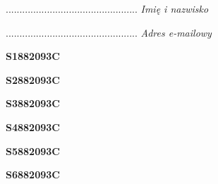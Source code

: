 \begin{turn}{90}\begin{minipage}{\linewidth} \vspace{20mm} ................................................  \textit{Imię i nazwisko}\end{minipage}\end{turn}

\begin{turn}{90}\begin{minipage}{\linewidth} \vspace{20mm} ................................................  \textit{Adres e-mailowy}\end{minipage}\end{turn}

\begin{turn}{90}\huge \begin{minipage}{\linewidth} \vspace{10mm}\textbf{S1882093C}\end{minipage}\end{turn}

\begin{turn}{90}\huge \begin{minipage}{\linewidth} \vspace{10mm}\textbf{S2882093C}\end{minipage}\end{turn}

\begin{turn}{90}\huge \begin{minipage}{\linewidth} \vspace{10mm}\textbf{S3882093C}\end{minipage}\end{turn}

\begin{turn}{90}\huge \begin{minipage}{\linewidth} \vspace{10mm}\textbf{S4882093C}\end{minipage}\end{turn}

\begin{turn}{90}\huge \begin{minipage}{\linewidth} \vspace{10mm}\textbf{S5882093C}\end{minipage}\end{turn}

\begin{turn}{90}\huge \begin{minipage}{\linewidth} \vspace{10mm}\textbf{S6882093C}\end{minipage}\end{turn}

